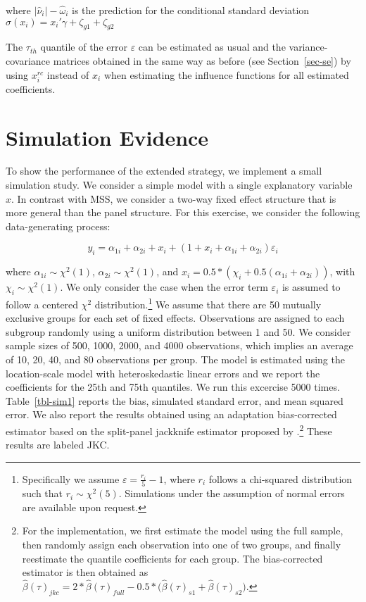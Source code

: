 \documentclass[
  authoryear,
  review,
  1p]{elsarticle}
\begin{document}
where \(|\hat\nu_{i}|- \hat \omega_{i}\) is the prediction for the
conditional standard deviation
\(\sigma(x_i)=x_{i}' \gamma + \zeta_{g1} + \zeta_{g2}\)

The \(\tau_{th}\) quantile of the error \(\varepsilon\) can be estimated
as usual and the variance-covariance matrices obtained in the same way
as before (see Section~\ref{sec-se}) by using \(x_{i}^{rc}\) instead of
\(x_{i}\) when estimating the influence functions for all estimated
coefficients.

\section{Simulation Evidence}\label{simulation-evidence}

To show the performance of the extended strategy, we implement a small
simulation study. We consider a simple model with a single explanatory
variable \(x\). In contrast with MSS, we consider a two-way fixed effect
structure that is more general than the panel structure. For this
exercise, we consider the following data-generating process:

\[y_i = \alpha_{1i} + \alpha_{2i} + x_i + (1+x_i + \alpha_{1i} + \alpha_{2i} ) \varepsilon_i
\]

where \(\alpha_{1i}\sim \chi^2(1)\), \(\alpha_{2i} \sim \chi^2(1)\), and
\(x_i = 0.5 * (\chi_i +0.5(\alpha_{1i}+\alpha_{2i}))\), with
\(\chi_i \sim \chi^2(1)\). We only consider the case when the error term
\(\varepsilon_i\) is assumed to follow a centered \(\chi^2\)
distribution.\footnote{Specifically we assume
  \(\varepsilon=\frac{r_i}{5}-1\), where \(r_i\) follows a chi-squared
  distribution such that \(r_i \sim \chi^2(5)\). Simulations under the
  assumption of normal errors are available upon request.} We assume
that there are 50 mutually exclusive groups for each set of fixed
effects. Observations are assigned to each subgroup randomly using a
uniform distribution between 1 and 50. We consider sample sizes of 500,
1000, 2000, and 4000 observations, which implies an average of 10, 20,
40, and 80 observations per group. The model is estimated using the
location-scale model with heteroskedastic linear errors and we report
the coefficients for the 25th and 75th quantiles. We run this excercise
5000 times. Table~\ref{tbl-sim1} reports the bias, simulated standard
error, and mean squared error. We also report the results obtained using
an adaptation bias-corrected estimator based on the split-panel
jackknife estimator proposed by \citet{dhaene2015}.\footnote{For the
  implementation, we first estimate the model using the full sample,
  then randomly assign each observation into one of two groups, and
  finally reestimate the quantile coefficients for each group. The
  bias-corrected estimator is then obtained as
  \(\hat\beta(\tau)_{jkc}=2*\hat\beta(\tau)_{full}-0.5*\big(\hat\beta(\tau)_{s1}+\hat\beta(\tau)_{s2}\big)\).}
These results are labeled JKC.
\end{document}
